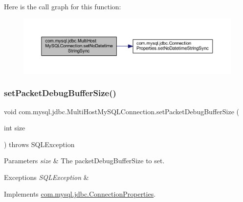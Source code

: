 Here is the call graph for this function\+:
\nopagebreak
\begin{figure}[H]
\begin{center}
\leavevmode
\includegraphics[width=350pt]{classcom_1_1mysql_1_1jdbc_1_1_multi_host_my_s_q_l_connection_a1996dbebf438d31e262c88898b0fbba0_cgraph}
\end{center}
\end{figure}
\mbox{\label{classcom_1_1mysql_1_1jdbc_1_1_multi_host_my_s_q_l_connection_a40dfa273870f39c257a9eb9feaad70b0}} 
\subsubsection{\texorpdfstring{set\+Packet\+Debug\+Buffer\+Size()}{setPacketDebugBufferSize()}}
{\footnotesize\ttfamily void com.\+mysql.\+jdbc.\+Multi\+Host\+My\+S\+Q\+L\+Connection.\+set\+Packet\+Debug\+Buffer\+Size (\begin{DoxyParamCaption}\item[{int}]{size }\end{DoxyParamCaption}) throws S\+Q\+L\+Exception}


\begin{DoxyParams}{Parameters}
{\em size} & The packet\+Debug\+Buffer\+Size to set. \\
\hline
\end{DoxyParams}

\begin{DoxyExceptions}{Exceptions}
{\em S\+Q\+L\+Exception} & \\
\hline
\end{DoxyExceptions}


Implements \mbox{\hyperlink{interfacecom_1_1mysql_1_1jdbc_1_1_connection_properties_ae0414fc9a146276fb458dc6e6b423f98}{com.\+mysql.\+jdbc.\+Connection\+Properties}}.

